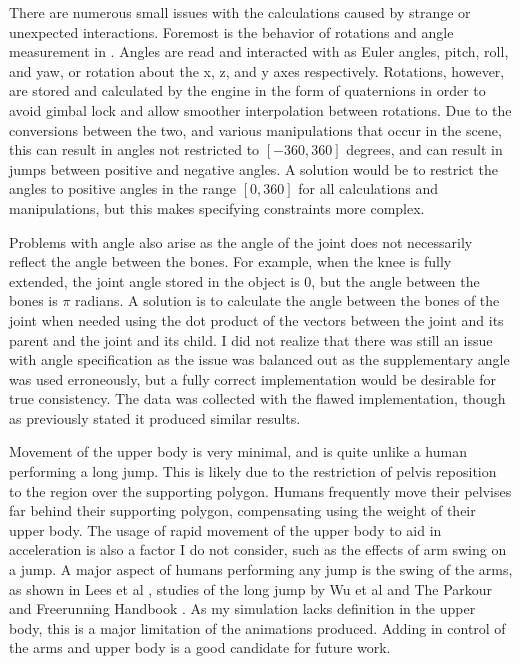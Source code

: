 There are numerous small issues with the calculations caused by strange or unexpected interactions.  Foremost is the behavior of rotations and angle measurement in \unity{}.  Angles are read and interacted with as Euler angles, pitch, roll, and yaw, or rotation about the x, z, and y axes respectively.  Rotations, however, are stored and calculated by the engine in the form of quaternions in order to avoid gimbal lock and allow smoother interpolation between rotations.  Due to the conversions between the two, and various manipulations that occur in the scene, this can result in angles not restricted to $[-360, 360]$ degrees, and can result in jumps between positive and negative angles.  A solution would be to restrict the angles to positive angles in the range $[0,360]$ for all calculations and manipulations, but this makes specifying constraints more complex.  

Problems with angle also arise as the angle of the joint does not necessarily reflect the angle between the bones.  For example, when the knee is fully extended, the joint angle stored in the object is 0, but the angle between the bones is $\pi$ radians.  A solution is to calculate the angle between the bones of the joint when needed using the dot product of the vectors between the joint and its parent and the joint and its child.  I did not realize that there was still an issue with angle specification as the issue was balanced out as the supplementary angle was used erroneously, but a fully correct implementation would be desirable for true consistency.  The data was collected with the flawed implementation, though as previously stated it produced similar results.

Movement of the upper body is very minimal, and is quite unlike a human performing a long jump.  This is likely due to the restriction of pelvis reposition to the region over the supporting polygon.  Humans frequently move their pelvises far behind their supporting polygon, compensating using the weight of their upper body.  The usage of rapid movement of the upper body to aid in acceleration is also a factor I do not consider, such as the effects of arm swing on a jump.  A major aspect of humans performing any jump is the swing of the arms, as shown in Lees et al \cite{lees_arm_swing}, studies of the long jump by Wu et al \cite{longjump} and The Parkour and Freerunning Handbook \cite{parkour}.  As my simulation lacks definition in the upper body, this is a major limitation of the animations produced.  Adding in control of the arms and upper body is a good candidate for future work.

